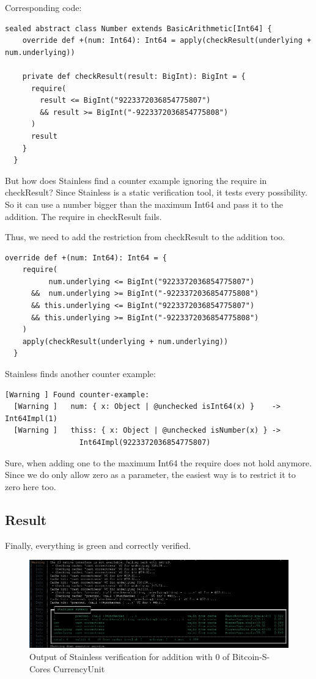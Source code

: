 \documentclass[runningheads]{llncs}
\begin{document}
Corresponding code:

\begin{lstlisting}[style=scala]
  sealed abstract class Number extends BasicArithmetic[Int64] {
    override def +(num: Int64): Int64 = apply(checkResult(underlying + num.underlying))

    private def checkResult(result: BigInt): BigInt = {
      require(
        result <= BigInt("9223372036854775807")
        && result >= BigInt("-9223372036854775808")
      )
      result
    }
  }
\end{lstlisting}

But how does Stainless find a counter example ignoring the require in checkResult?
Since Stainless is a static verification tool, it tests every possibility.
So it can use a number bigger than the maximum Int64 and pass it to the addition.
The require in checkResult fails.

Thus, we need to add the restriction from checkResult to the addition too.
\begin{lstlisting}[style=scala]
  override def +(num: Int64): Int64 = {
    require(
          num.underlying <= BigInt("9223372036854775807")
      &&  num.underlying >= BigInt("-9223372036854775808")
      && this.underlying <= BigInt("9223372036854775807")
      && this.underlying >= BigInt("-9223372036854775808")
    )
    apply(checkResult(underlying + num.underlying))
  }
\end{lstlisting}

Stainless finds another counter example:
\begin{lstlisting}[style=stainless]
  [Warning ] Found counter-example:
  [Warning ]   num: { x: Object | @unchecked isInt64(x) }    -> Int64Impl(1)
  [Warning ]   thiss: { x: Object | @unchecked isNumber(x) } ->
                 Int64Impl(9223372036854775807)
\end{lstlisting}

Sure, when adding one to the maximum Int64 the require does not hold anymore.
Since we do only allow zero as a parameter, the easiest way is to restrict it to zero here too.


\subsection{Result}

Finally, everything is green and correctly verified.
\begin{figure}
	\centering
		\includegraphics[width=\textwidth]{final_verify_output}
	\caption{Output of Stainless verification for addition with 0 of Bitcoin-S-Cores CurrencyUnit}
\end{figure}
\end{document}
